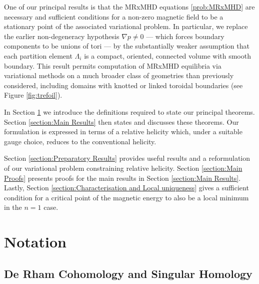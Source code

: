 \documentclass[11pt]{article}
\theoremstyle{plain}
\theoremstyle{definition}
\theoremstyle{remark}
\newcommand{\ST}{\Lambda}
\begin{document}
One of our principal results is that the MRxMHD equations \eqref{prob:MRxMHD} are necessary and sufficient conditions for a non-zero magnetic field to be a stationary point of the associated variational problem. In particular, we replace the earlier non-degeneracy hypothesis \(\nabla p\neq0\) — which forces boundary components to be unions of tori — by the substantially weaker assumption that each partition element \(\ST_i\) is a compact, oriented, connected volume with smooth boundary. This result permits computation of MRxMHD equilibria via variational methods on a much broader class of geometries than previously considered, including domains with knotted or linked toroidal boundaries (see Figure \ref{fig:trefoil}). 



In Section \ref{section:Problem Construction} we introduce the definitions required to state our principal theorems. Section \ref{section:Main Results} then states and discusses these theorems. Our formulation is expressed in terms of a relative helicity which, under a suitable gauge choice, reduces to the conventional helicity. 



Section \ref{section:Preparatory Results} provides useful results and a reformulation of our variational problem constraining relative helicity. Section \ref{section:Main Proofs} presents proofs for the main results in Section \ref{section:Main Results}. Lastly, Section \ref{section:Characterisation and Local uniqueness} gives a sufficient condition for a critical point of the magnetic energy to also be a local minimum in the \(n=1 \) case. 





\section{Notation}\label{section:Problem Construction}





\subsection{De Rham Cohomology and Singular Homology}
\end{document}
